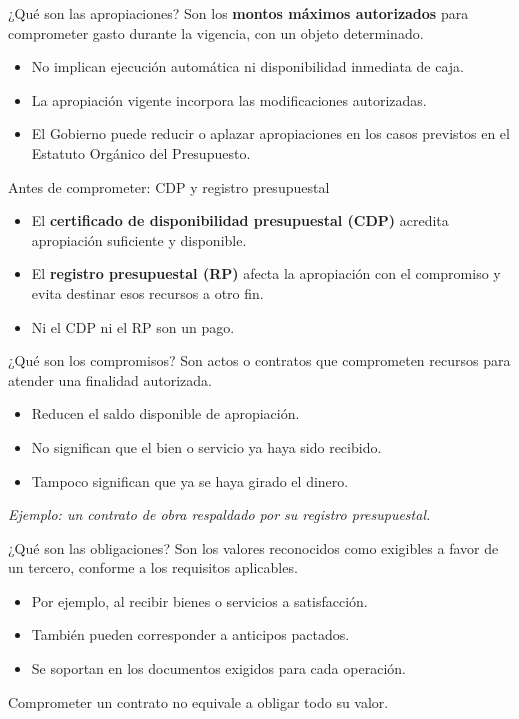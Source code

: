 \begin{frame}{¿Qué son las apropiaciones?}
Son los \textbf{montos máximos autorizados} para comprometer gasto durante la vigencia, con un objeto determinado.
\begin{itemize}
  \item No implican ejecución automática ni disponibilidad inmediata de caja.
  \item La apropiación vigente incorpora las modificaciones autorizadas.
  \item El Gobierno puede reducir o aplazar apropiaciones en los casos previstos en el Estatuto Orgánico del Presupuesto.
\end{itemize}
\end{frame}

\begin{frame}{Antes de comprometer: CDP y registro presupuestal}
\begin{itemize}
  \item El \textbf{certificado de disponibilidad presupuestal (CDP)} acredita apropiación suficiente y disponible.
  \item El \textbf{registro presupuestal (RP)} afecta la apropiación con el compromiso y evita destinar esos recursos a otro fin.
  \item Ni el CDP ni el RP son un pago.
\end{itemize}
\end{frame}

\begin{frame}{¿Qué son los compromisos?}
Son actos o contratos que comprometen recursos para atender una finalidad autorizada.
\begin{itemize}
  \item Reducen el saldo disponible de apropiación.
  \item No significan que el bien o servicio ya haya sido recibido.
  \item Tampoco significan que ya se haya girado el dinero.
\end{itemize}
\vspace{0.7em}
\textit{Ejemplo: un contrato de obra respaldado por su registro presupuestal.}
\end{frame}

\begin{frame}{¿Qué son las obligaciones?}
Son los valores reconocidos como exigibles a favor de un tercero, conforme a los requisitos aplicables.
\begin{itemize}
  \item Por ejemplo, al recibir bienes o servicios a satisfacción.
  \item También pueden corresponder a anticipos pactados.
  \item Se soportan en los documentos exigidos para cada operación.
\end{itemize}
\vspace{0.7em}
Comprometer un contrato no equivale a obligar todo su valor.
\end{frame}

